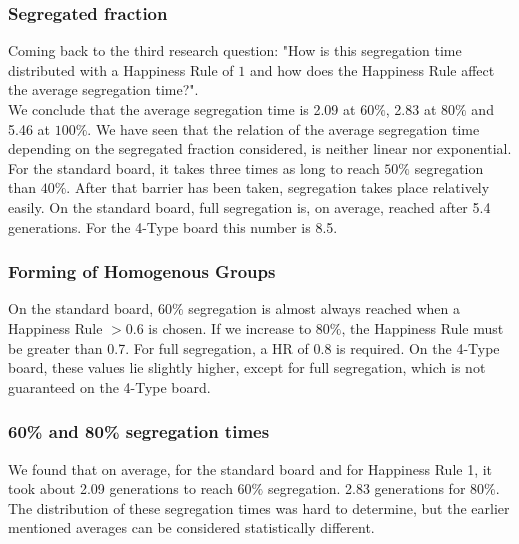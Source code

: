 \subsubsection*{Segregated fraction}
Coming back to the third research question: "How is this segregation time distributed with a Happiness Rule of \(1\) and how does the Happiness Rule affect the average segregation time?".\\
We conclude that the average segregation time  is 2.09 at \(60\%\), 2.83 at \(80\%\) and 5.46 at \(100\%\).
We have seen that the relation of the average segregation time depending on the segregated fraction considered, is neither linear nor exponential. For the standard board, it takes three times as long to reach $50\%$ segregation than $40\%$. After that barrier has been taken, segregation takes place relatively easily. On the standard board, full segregation is, on average, reached after 5.4 generations. For the 4-Type board this number is 8.5.

\subsubsection*{Forming of Homogenous Groups}
On the standard board, $60\%$ segregation is almost always reached when a Happiness Rule $>0.6$ is chosen. If we increase to $80\%$, the Happiness Rule must be greater than 0.7. For full segregation, a HR of 0.8 is required. On the 4-Type board, these values lie slightly higher, except for full segregation, which is not guaranteed on the 4-Type board.

\subsubsection*{60\% and 80\% segregation times}
We found that on average, for the standard board and for Happiness Rule 1, it took about 2.09 generations to reach $60\%$ segregation. 2.83 generations for $80\%$. The distribution of these segregation times was hard to determine, but the earlier mentioned averages can be considered statistically different.